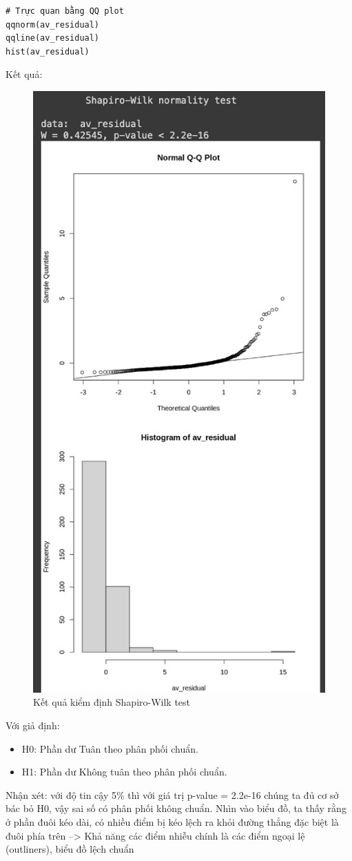 \begin{itemize}
\begin{itemize}
\begin{itemize}
\begin{lstlisting}
# Trực quan bằng QQ plot
qqnorm(av_residual)
qqline(av_residual)
hist(av_residual)
        \end{lstlisting}
        Kết quả:
\begin{figure}
    \centering
    \includegraphics[width=0.6\linewidth]{part23_figures/15.png}
    \caption{Kết quả kiểm định Shapiro-Wilk test}
    \label{fig:Kết quả kiểm định Shapiro-Wilk test}
\end{figure}
        Với giả định:
        \begin{itemize}
            \item H0: Phần dư Tuân theo phân phối chuẩn.
            \item H1: Phần dư Không tuân theo phân phối chuẩn.
        \end{itemize}
        Nhận xét: với độ tin cậy 5\% thì với giá trị p-value = 2.2e-16 chúng ta đủ cơ sở bác bỏ H0, vậy sai số có phân phối không chuẩn. Nhìn vào biểu đồ, ta thấy rằng ở phần đuôi kéo dài, có nhiều điểm bị kéo lệch ra khỏi đường thẳng đặc biệt là đuôi phía trên --> Khả năng các điểm nhiễu chính là các điểm ngoại lệ (outliners), biểu đồ lệch chuẩn


\end{itemize}
\end{itemize}
\end{itemize}
